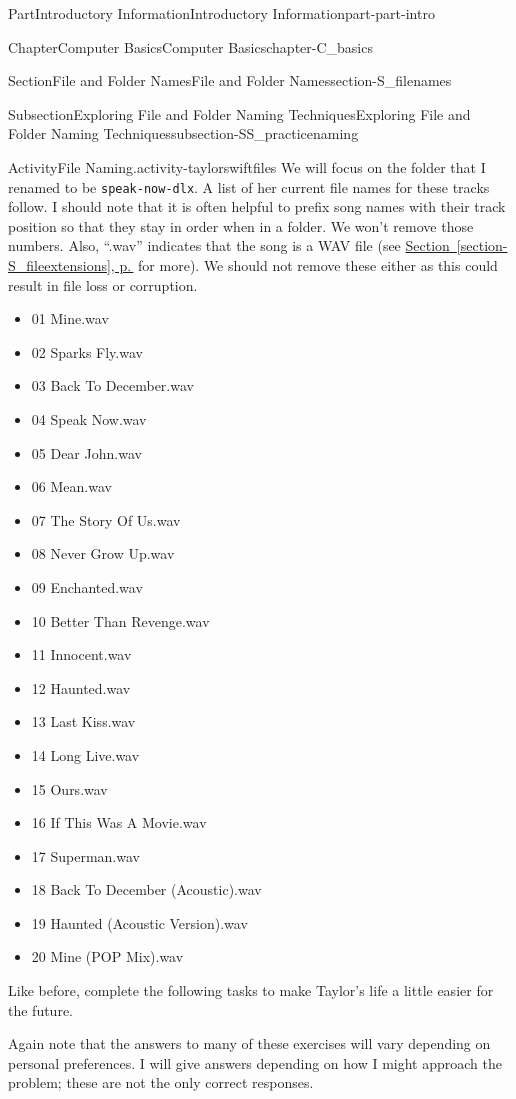 \documentclass[twoside,10pt,]{book}
\newcommand{\xreffont}{\relax}
\newcommand{\mono}[1]{\texttt{#1}}
\begin{document}
\begin{partptx}{Part}{Introductory Information}{}{Introductory Information}{}{}{part-part-intro}
\begin{chapterptx}{Chapter}{Computer Basics}{}{Computer Basics}{}{}{chapter-C_basics}
\begin{sectionptx}{Section}{File and Folder Names}{}{File and Folder Names}{}{}{section-S_filenames}
\begin{subsectionptx}{Subsection}{Exploring File and Folder Naming Techniques}{}{Exploring File and Folder Naming Techniques}{}{}{subsection-SS_practicenaming}
\begin{activity}{Activity}{File Naming.}{activity-taylorswiftfiles}
%
We will focus on the folder that I renamed to be \mono{speak-now-dlx}. A list of her current file names for these tracks follow. I should note that it is often helpful to prefix song names with their track position so that they stay in order when in a folder. We won't remove those numbers. Also, ``.wav'' indicates that the song is a WAV file (see \hyperref[section-S_fileextensions]{Section~{\xreffont\ref{section-S_fileextensions}}, p.\,\pageref{section-S_fileextensions}} for more). We should not remove these either as this could result in file loss or corruption.%
\begin{multicols}{2}
\begin{itemize}[label=\textbullet]
\item{}01 Mine.wav%
\item{}02 Sparks Fly.wav%
\item{}03 Back To December.wav%
\item{}04 Speak Now.wav%
\item{}05 Dear John.wav%
\item{}06 Mean.wav%
\item{}07 The Story Of Us.wav%
\item{}08 Never Grow Up.wav%
\item{}09 Enchanted.wav%
\item{}10 Better Than Revenge.wav%
\item{}11 Innocent.wav%
\item{}12 Haunted.wav%
\item{}13 Last Kiss.wav%
\item{}14 Long Live.wav%
\item{}15 Ours.wav%
\item{}16 If This Was A Movie.wav%
\item{}17 Superman.wav%
\item{}18 Back To December (Acoustic).wav%
\item{}19 Haunted (Acoustic Version).wav%
\item{}20 Mine (POP Mix).wav%
\end{itemize}
\end{multicols}
%
\par
Like before, complete the following tasks to make Taylor's life a little easier for the future.%
\par
Again note that the answers to many of these exercises will vary depending on personal preferences. I will give answers depending on how I might approach the problem; these are not the only correct responses.%
\begin{enumerate}[font=\bfseries,label=(\alph*),ref=\alph*]%

\end{enumerate}
\end{activity}
\end{subsectionptx}
\end{sectionptx}
\end{chapterptx}
\end{partptx}
\end{document}
